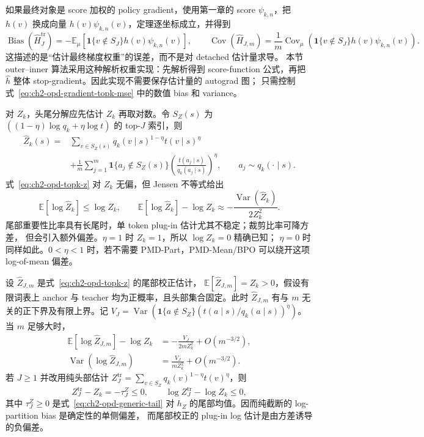 如果最终对象是 score 加权的 policy gradient，使用第一章的 score $\psi_{k,n}$，把 $h(v)$ 换成向量 $h(v)\psi_{k,n}(v)$，定理逐坐标成立，并得到
\begin{equation}
\operatorname{Bias}(\widehat H_J^{\mathrm{tr}})
 =-\mathbb E_\mu[\mathbf 1\{v\notin S_J\}h(v)\psi_{k,n}(v)],
\qquad
\operatorname{Cov}(\widehat H_{J,m})
 =\frac1m\operatorname{Cov}_\mu(\mathbf 1\{v\notin S_J\}h(v)\psi_{k,n}(v)).
\label{eq:ch2-opd-gradient-topk-mse}
\end{equation}
这描述的是“估计最终梯度权重”的误差，而不是对 detached 估计量求导。 本节 outer--inner 算法采用这种解析权重实现：先解析得到 score-function 公式，再把 $\widehat h$ 整体 stop-gradient。因此实现不需要保存估计量的 autograd 图； 只需控制式~\eqref{eq:ch2-opd-gradient-topk-mse} 中的数值 bias 和 variance。

对 $Z_k$，头尾分解应先估计 $Z_k$ 再取对数。令 $S_Z(s)$ 为 $((1-\eta)\log q_k+\eta\log t)$ 的 top-$J$ 索引，则
\begin{align}
\widehat Z_k(s)
={}&\sum_{v\in S_Z(s)}q_k(v\mid s)^{1-\eta}t(v\mid s)^\eta\\
&+\frac1m\sum_{j=1}^{m}\mathbf 1\{a_j\notin S_Z(s)\}
\left(\frac{t(a_j\mid s)}{q_k(a_j\mid s)}\right)^\eta,
\qquad a_j\sim q_k(\cdot\mid s).
\label{eq:ch2-opd-topk-z}
\end{align}
式~\eqref{eq:ch2-opd-topk-z} 对 $Z_k$ 无偏，但 Jensen 不等式给出
\begin{equation}
\mathbb E[\log\widehat Z_k]\leq\log Z_k,
\qquad
\mathbb E[\log\widehat Z_k]-\log Z_k
\approx-\frac{\operatorname{Var}(\widehat Z_k)}{2Z_k^2}.
\end{equation}
尾部重要性比率具有长尾时，单 token plug-in 估计尤其不稳定；裁剪比率可降方差， 但会引入额外偏差。$\eta=1$ 时 $Z_k=1$，所以 $\log Z_k=0$ 精确已知； $\eta=0$ 时同样如此。$0<\eta<1$ 时，若不需要 PMD-Part，PMD-Mean/BPO 可以绕开这项 log-of-mean 偏差。

\begin{theorem}
\label{thm:ch2-opd-logz-delta}
设 $\widehat Z_{J,m}$ 是式~\eqref{eq:ch2-opd-topk-z} 的尾部校正估计， $\mathbb E[\widehat Z_{J,m}]=Z_k>0$，假设有限词表上 anchor 与 teacher 均为正概率，且头部集合固定。此时 $\widehat Z_{J,m}$ 有与 $m$ 无关的正下界及有限上界。记 $V_{J}=\operatorname{Var}(\mathbf 1\{a\notin S_Z\} (t(a\mid s)/q_k(a\mid s))^\eta)$。当 $m$ 足够大时，
\begin{align}
\mathbb E[\log\widehat Z_{J,m}]-\log Z_k
&=-\frac{V_J}{2mZ_k^2}+O(m^{-3/2}),\\
\operatorname{Var}(\log\widehat Z_{J,m})
&=\frac{V_J}{mZ_k^2}+O(m^{-3/2}).
\end{align}
若 $J\ge1$ 并改用纯头部估计 $Z_J^{\mathrm{tr}}=\sum_{v\in S_Z} q_k(v)^{1-\eta}t(v)^\eta$，则
\begin{equation}
Z_J^{\mathrm{tr}}-Z_k=-\tau_J^Z\le0,
\qquad
\log Z_J^{\mathrm{tr}}-\log Z_k\le0,
\end{equation}
其中 $\tau_J^Z\ge0$ 是式~\eqref{eq:ch2-opd-generic-tail} 对 $h_Z$ 的尾部均值。因而纯截断的 log-partition bias 是确定性的单侧偏差， 而尾部校正的 plug-in log 估计是由方差诱导的负偏差。
\end{theorem}

